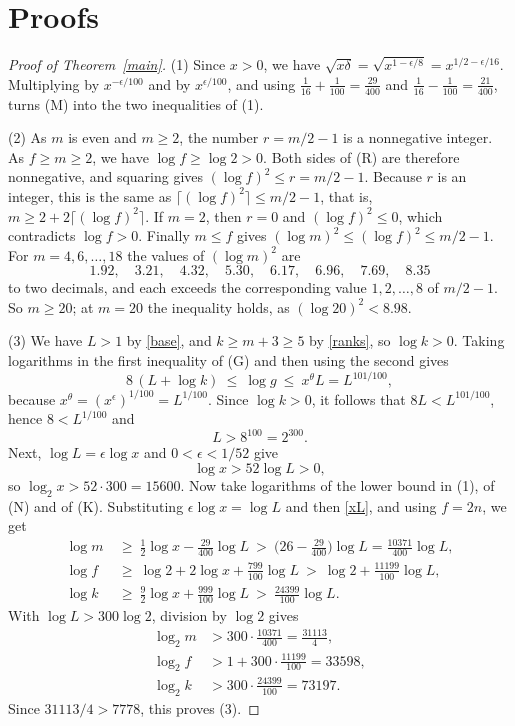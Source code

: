 \documentclass[11pt]{amsart}
\theoremstyle{definition}
\theoremstyle{remark}
\newcommand{\tagM}{\textup{(M)}}
\newcommand{\tagR}{\textup{(R)}}
\newcommand{\tagG}{\textup{(G)}}
\newcommand{\tagN}{\textup{(N)}}
\newcommand{\tagK}{\textup{(K)}}
\begin{document}
\section{Proofs}

\begin{proof}[Proof of Theorem~\ref{main}]
(1) Since $x>0$, we have $\sqrt{x\delta}=\sqrt{x^{1-\epsilon/8}}=x^{1/2-\epsilon/16}$. Multiplying by $x^{-\epsilon/100}$ and by $x^{\epsilon/100}$, and using $\frac1{16}+\frac1{100}=\frac{29}{400}$ and $\frac1{16}-\frac1{100}=\frac{21}{400}$, turns \tagM{} into the two inequalities of (1).

(2) As $m$ is even and $m\ge2$, the number $r=m/2-1$ is a nonnegative integer. As $f\ge m\ge2$, we have $\log f\ge\log2>0$. Both sides of \tagR{} are therefore nonnegative, and squaring gives $(\log f)^2\le r=m/2-1$. Because $r$ is an integer, this is the same as $\lceil(\log f)^2\rceil\le m/2-1$, that is, $m\ge2+2\lceil(\log f)^2\rceil$. If $m=2$, then $r=0$ and $(\log f)^2\le0$, which contradicts $\log f>0$. Finally $m\le f$ gives $(\log m)^2\le(\log f)^2\le m/2-1$. For $m=4,6,\dots,18$ the values of $(\log m)^2$ are
\[
 1.92,\quad3.21,\quad4.32,\quad5.30,\quad6.17,\quad6.96,\quad7.69,\quad8.35
\]
to two decimals, and each exceeds the corresponding value $1,2,\dots,8$ of $m/2-1$. So $m\ge20$; at $m=20$ the inequality holds, as $(\log20)^2<8.98$.

(3) We have $L>1$ by \eqref{base}, and $k\ge m+3\ge5$ by \eqref{ranks}, so $\log k>0$. Taking logarithms in the first inequality of \tagG{} and then using the second gives
\begin{equation}\label{elim}
 8\,(L+\log k)\ \le\ \log g\ \le\ x^{\theta}L=L^{101/100},
\end{equation}
because $x^{\theta}=(x^{\epsilon})^{1/100}=L^{1/100}$. Since $\log k>0$, it follows that $8L<L^{101/100}$, hence $8<L^{1/100}$ and
\[
 L>8^{100}=2^{300}.
\]
Next, $\log L=\epsilon\log x$ and $0<\epsilon<1/52$ give
\begin{equation}\label{xL}
 \log x>52\log L>0,
\end{equation}
so $\log_2x>52\cdot300=15600$. Now take logarithms of the lower bound in (1), of \tagN{} and of \tagK. Substituting $\epsilon\log x=\log L$ and then \eqref{xL}, and using $f=2n$, we get
\begin{align*}
 \log m&\ \ge\ \tfrac12\log x-\tfrac{29}{400}\log L\ >\ \bigl(26-\tfrac{29}{400}\bigr)\log L=\tfrac{10371}{400}\log L,\\
 \log f&\ \ge\ \log2+2\log x+\tfrac{799}{100}\log L\ >\ \log2+\tfrac{11199}{100}\log L,\\
 \log k&\ \ge\ \tfrac92\log x+\tfrac{999}{100}\log L\ >\ \tfrac{24399}{100}\log L.
\end{align*}
With $\log L>300\log2$, division by $\log2$ gives
\begin{align*}
 \log_2m&>300\cdot\tfrac{10371}{400}=\tfrac{31113}4,\\
 \log_2f&>1+300\cdot\tfrac{11199}{100}=33598,\\
 \log_2k&>300\cdot\tfrac{24399}{100}=73197 .
\end{align*}
Since $31113/4>7778$, this proves (3).
\end{proof}
\end{document}
